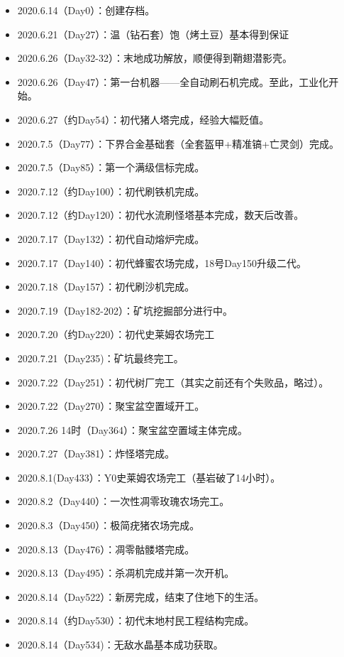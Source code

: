 \documentclass[openany]{book}
\theoremstyle{remark}\newtheorem*{remark}{Remark}
\begin{document}
	\begin{itemize}
		\item 2020.6.14（Day0）：创建存档。
		\item 2020.6.21（Day27）：温（钻石套）饱（烤土豆）基本得到保证
		\item 2020.6.26（Day32-32）：末地成功解放，顺便得到鞘翅潜影壳。
		\item 2020.6.26（Day47）：第一台机器——全自动刷石机完成。至此，工业化开始。
		\item 2020.6.27（约Day54）：初代猪人塔完成，经验大幅贬值。
		\item 2020.7.5（Day77）：下界合金基础套（全套盔甲+精准镐+亡灵剑）完成。
		\item 2020.7.5（Day85）：第一个满级信标完成。
		\item 2020.7.12（约Day100）：初代刷铁机完成。
		\item 2020.7.12（约Day120）：初代水流刷怪塔基本完成，数天后改善。
		\item 2020.7.17（Day132）：初代自动熔炉完成。
		\item 2020.7.17（Day140）：初代蜂蜜农场完成，18号Day150升级二代。
		\item 2020.7.18（Day157）：初代刷沙机完成。
		\item 2020.7.19（Day182-202）：矿坑挖掘部分进行中。
		\item 2020.7.20（约Day220）：初代史莱姆农场完工
		\item 2020.7.21（Day235)：矿坑最终完工。
		\item 2020.7.22（Day251）：初代树厂完工（其实之前还有个失败品，略过）。
		\item 2020.7.22（Day270）：聚宝盆空置域开工。
		\item 2020.7.26 14时（Day364）：聚宝盆空置域主体完成。
		\item 2020.7.27（Day381）：炸怪塔完成。
		\item 2020.8.1(Day433）：Y0史莱姆农场完工（基岩破了14小时）。
		\item 2020.8.2（Day440）：一次性凋零玫瑰农场完工。
		\item 2020.8.3（Day450）：极简疣猪农场完成。
		\item 2020.8.13（Day476）：凋零骷髅塔完成。
		\item 2020.8.13（Day495）：杀凋机完成并第一次开机。
		\item 2020.8.14（Day522）：新房完成，结束了住地下的生活。
		\item 2020.8.14（约Day530）：初代末地村民工程结构完成。
		\item 2020.8.14（Day534)：无敌水晶基本成功获取。

\end{itemize}
\end{document}
